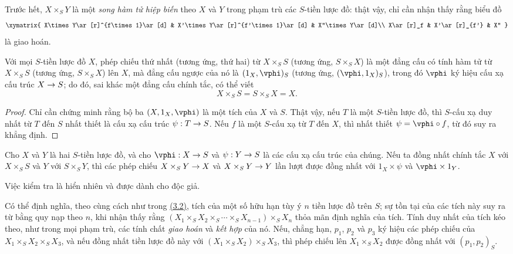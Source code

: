 \documentclass[oneside]{amsart}
\makeatletter
\newcommand{\ega@arrow}[2]{\mathchoice{#1}{#2}{#2}{#2}}
\renewcommand{\to}{\ega@arrow{\longrightarrow}{\rightarrow}}
\newcommand{\oldpage}[2][]{{\marginnote{\normalfont\textbf{#1}~|~#2}}\ignorespaces}
\let\EGAOriginalLabel\label
\renewcommand{\label}[1]{\phantomsection\EGAOriginalLabel{#1}}
\makeatother
\begin{document}
\begin{env}[3.3.2]
\label{I.3.3.2}
Trước hết, $X\times_S Y$ là một \emph{song hàm tử hiệp biến} theo $X$ và
$Y$ trong phạm trù các $S$-tiền lược đồ: thật vậy, chỉ cần nhận thấy rằng
biểu đồ
\[
  \xymatrix{
    X\times Y\ar[r]^{f\times 1}\ar[d] &
    X'\times Y\ar[r]^{f'\times 1}\ar[d] &
    X''\times Y\ar[d]\\
    X\ar[r]_f & X'\ar[r]_{f'} & X''
  }
\]
là giao hoán.
\end{env}

\begin{proposition}[3.3.3]
\label{I.3.3.3}
Với mọi $S$-tiền lược đồ $X$, phép chiếu thứ nhất (tương ứng, thứ hai) từ
$X\times_S S$ (tương ứng, $S\times_S X$) là một đẳng cấu có tính hàm tử từ
$X\times_S S$ (tương ứng, $S\times_S X$) lên $X$, mà đẳng cấu ngược của nó là
$(1_X,\vphi)_S$ (tương ứng, $(\vphi,1_X)_S$), trong đó $\vphi$ ký hiệu cấu xạ
cấu trúc $X\to S$; do đó, sai khác một đẳng cấu chính tắc, có thể viết
\[
  X\times_S S=S\times_S X=X.
\]
\end{proposition}

\begin{proof}
Chỉ cần chứng minh rằng bộ ba $(X,1_X,\vphi)$ là một tích của $X$ và $S$.
Thật vậy, nếu $T$ là một $S$-tiền lược đồ, thì $S$-cấu xạ duy nhất từ $T$
đến $S$ nhất thiết là cấu xạ cấu trúc $\psi:T\to S$. Nếu $f$ là một
$S$-cấu xạ từ $T$ đến $X$, thì nhất thiết $\psi=\vphi\circ f$, từ đó suy ra
khẳng định.
\end{proof}

\begin{corollary}[3.3.4]
\label{I.3.3.4}
Cho $X$ và $Y$ là hai $S$-tiền lược đồ, và cho $\vphi:X\to S$ và
$\psi:Y\to S$ là các cấu xạ cấu trúc của chúng. Nếu ta đồng nhất chính tắc
$X$ với $X\times_S S$ và $Y$ với $S\times_S Y$, thì các phép chiếu
$X\times_S Y\to X$ và $X\times_S Y\to Y$ lần lượt được đồng nhất với
$1_X\times\psi$ và $\vphi\times 1_Y$.
\end{corollary}

Việc kiểm tra là hiển nhiên và được dành cho độc giả.

\begin{env}[3.3.5]
\label{I.3.3.5}
Có thể định nghĩa, theo cùng cách như trong
\hyperref[subsection:I.3.2]{(3.2)}, tích của một
\oldpage[I]{109}
số hữu hạn tùy ý $n$ tiền lược đồ trên $S$; sự tồn tại của các tích này suy ra
từ  bằng quy nạp theo $n$, khi nhận thấy rằng
$(X_1\times_S X_2\times_S\cdots\times_S X_{n-1})\times_S X_n$ thỏa mãn định
nghĩa của tích. Tính duy nhất của tích kéo theo, như trong mọi phạm trù, các
tính chất \emph{giao hoán} và \emph{kết hợp} của nó. Nếu, chẳng hạn, $p_1$,
$p_2$ và $p_3$ ký hiệu các phép chiếu của
$X_1\times_S X_2\times_S X_3$, và nếu đồng nhất tiền lược đồ này với
$(X_1\times_S X_2)\times_S X_3$, thì phép chiếu lên
$X_1\times_S X_2$ được đồng nhất với $(p_1,p_2)_S$.
\end{env}
\end{document}
